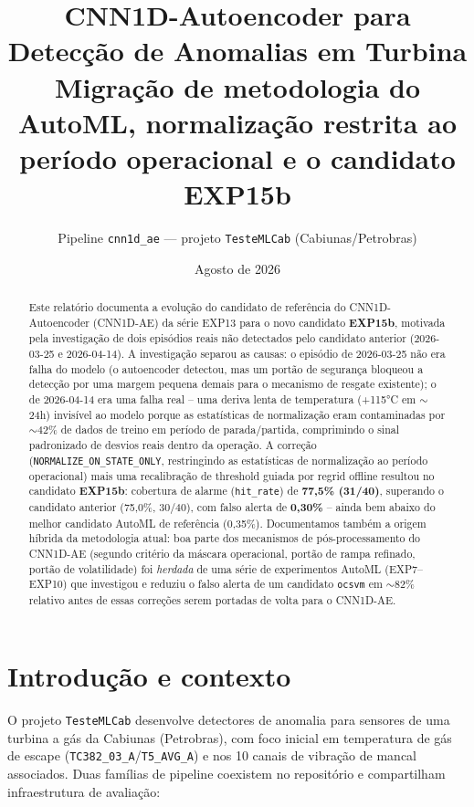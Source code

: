 \documentclass[11pt,a4paper]{article}
\title{CNN1D-Autoencoder para Detecção de Anomalias em Turbina\\
\large Migração de metodologia do AutoML, normalização restrita ao\\
período operacional e o candidato EXP15b}
\author{Pipeline \texttt{cnn1d\_ae} --- projeto \texttt{TesteMLCab} (Cabiunas/Petrobras)}
\date{Agosto de 2026}
\begin{document}
\maketitle

\begin{abstract}
Este relatório documenta a evolução do candidato de referência do
CNN1D-Autoencoder (CNN1D-AE) da série EXP13 para o novo candidato
\textbf{EXP15b}, motivada pela investigação de dois episódios reais não
detectados pelo candidato anterior (2026-03-25 e 2026-04-14). A
investigação separou as causas: o episódio de 2026-03-25 não era falha
do modelo (o autoencoder detectou, mas um portão de segurança bloqueou a
detecção por uma margem pequena demais para o mecanismo de resgate
existente); o de 2026-04-14 era uma falha real -- uma deriva lenta de
temperatura (+115°C em $\sim$24h) invisível ao modelo porque as
estatísticas de normalização eram contaminadas por $\sim$42\% de dados
de treino em período de parada/partida, comprimindo o sinal
padronizado de desvios reais dentro da operação. A correção
(\texttt{NORMALIZE\_ON\_STATE\_ONLY}, restringindo as estatísticas de
normalização ao período operacional) mais uma recalibração de
threshold guiada por regrid offline resultou no candidato
\textbf{EXP15b}: cobertura de alarme (\texttt{hit\_rate}) de
\textbf{77,5\% (31/40)}, superando o candidato anterior (75,0\%,
30/40), com falso alerta de \textbf{0,30\%} -- ainda bem abaixo do
melhor candidato AutoML de referência (0,35\%). Documentamos também a
origem híbrida da metodologia atual: boa parte dos mecanismos de
pós-processamento do CNN1D-AE (segundo critério da máscara operacional,
portão de rampa refinado, portão de volatilidade) foi \emph{herdada} de
uma série de experimentos AutoML (EXP7--EXP10) que investigou e reduziu
o falso alerta de um candidato \texttt{ocsvm} em $\sim$82\% relativo
antes de essas correções serem portadas de volta para o CNN1D-AE.
\end{abstract}

\tableofcontents

\section{Introdução e contexto}

O projeto \texttt{TesteMLCab} desenvolve detectores de anomalia para
sensores de uma turbina a gás da Cabiunas (Petrobras), com foco inicial
em temperatura de gás de escape (\texttt{TC382\_03\_A}/\texttt{T5\_AVG\_A})
e nos 10 canais de vibração de mancal associados. Duas famílias de
pipeline coexistem no repositório e compartilham infraestrutura de
avaliação:
\end{document}
